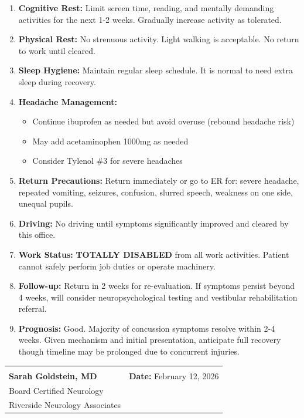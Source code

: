 \documentclass[11pt]{article}
\begin{document}
\begin{enumerate}
\item \textbf{Cognitive Rest:} Limit screen time, reading, and mentally demanding activities for the next 1-2 weeks. Gradually increase activity as tolerated.

\item \textbf{Physical Rest:} No strenuous activity. Light walking is acceptable. No return to work until cleared.

\item \textbf{Sleep Hygiene:} Maintain regular sleep schedule. It is normal to need extra sleep during recovery.

\item \textbf{Headache Management:}
\begin{itemize}[nosep]
\item Continue ibuprofen as needed but avoid overuse (rebound headache risk)
\item May add acetaminophen 1000mg as needed
\item Consider Tylenol \#3 for severe headaches
\end{itemize}

\item \textbf{Return Precautions:} Return immediately or go to ER for: severe headache, repeated vomiting, seizures, confusion, slurred speech, weakness on one side, unequal pupils.

\item \textbf{Driving:} No driving until symptoms significantly improved and cleared by this office.

\item \textbf{Work Status:} \textbf{TOTALLY DISABLED} from all work activities. Patient cannot safely perform job duties or operate machinery.

\item \textbf{Follow-up:} Return in 2 weeks for re-evaluation. If symptoms persist beyond 4 weeks, will consider neuropsychological testing and vestibular rehabilitation referral.

\item \textbf{Prognosis:} Good. Majority of concussion symptoms resolve within 2-4 weeks. Given mechanism and initial presentation, anticipate full recovery though timeline may be prolonged due to concurrent injuries.
\end{enumerate}

\vspace{2em}

\begin{tabular}{@{}p{7cm}p{7cm}@{}}
\hrulefill & \\
\textbf{Sarah Goldstein, MD} & \textbf{Date:} February 12, 2026 \\
Board Certified Neurology & \\
Riverside Neurology Associates & \\
\end{tabular}
\end{document}
